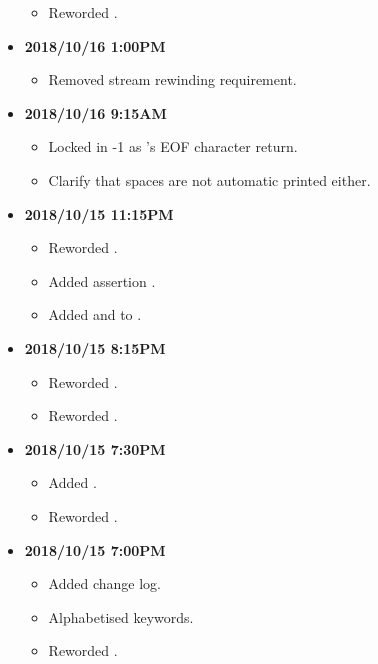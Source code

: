 \documentclass[../gazprea.tex]{subfiles}
\begin{document}
\begin{itemize}
\begin{itemize}
      \item Reworded .
    \end{itemize}
  \item
    \textbf{2018/10/16 1:00PM}
    \begin{itemize}
      \item Removed stream rewinding requirement.
    \end{itemize}
  \item
    \textbf{2018/10/16 9:15AM}
    \begin{itemize}
      \item Locked in -1 as 's EOF character return.
      \item Clarify that spaces are not automatic printed either.
    \end{itemize}
  \item
    \textbf{2018/10/15 11:15PM}
    \begin{itemize}
      \item Reworded .
      \item Added assertion .
      \item Added  and  to .
    \end{itemize}
  \item
    \textbf{2018/10/15 8:15PM}
    \begin{itemize}
      \item Reworded .
      \item Reworded .
    \end{itemize}
  \item
    \textbf{2018/10/15 7:30PM}
    \begin{itemize}
      \item Added .
      \item Reworded .
    \end{itemize}
  \item
    \textbf{2018/10/15 7:00PM}
    \begin{itemize}
      \item Added change log.
      \item Alphabetised keywords.
      \item Reworded .
    \end{itemize}
\end{itemize}
\end{document}
